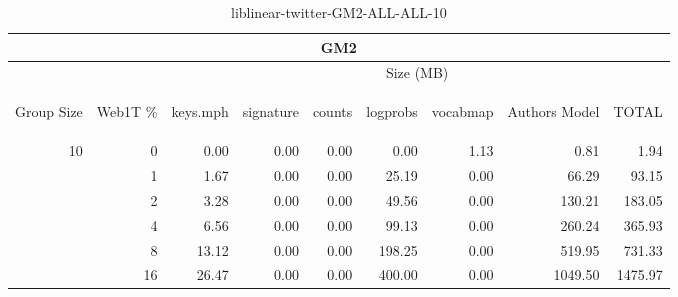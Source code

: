 \begin{center}
\begin{table}[htbp] 
 \begin{center}
\begin{tabular}{ | r | r | r | r | r | r | r | r | r |}
\hline
\multicolumn{9}{|c|}{GM2}\\
\hline
 & & \multicolumn{7}{|c|}{Size (MB)}\\ \cline{3-9}
\begin{sideways}Group Size\end{sideways} & \begin{sideways}Web1T \% \end{sideways} & \begin{sideways}keys.mph\end{sideways} & \begin{sideways}signature\end{sideways} & \begin{sideways}counts\end{sideways} & \begin{sideways}logprobs\end{sideways} & \begin{sideways}vocabmap\end{sideways} & \begin{sideways}Authors Model \end{sideways} & \begin{sideways}TOTAL\end{sideways}\\
\hline
\multirow{5}{*}{10}
 & 0 & 0.00 & 0.00 & 0.00 & 0.00 & 1.13 & 0.81 & 1.94\\ \cline{2-9}
 & 1 & 1.67 & 0.00 & 0.00 & 25.19 & 0.00 & 66.29 & 93.15\\ \cline{2-9}
 & 2 & 3.28 & 0.00 & 0.00 & 49.56 & 0.00 & 130.21 & 183.05\\ \cline{2-9}
 & 4 & 6.56 & 0.00 & 0.00 & 99.13 & 0.00 & 260.24 & 365.93\\ \cline{2-9}
 & 8 & 13.12 & 0.00 & 0.00 & 198.25 & 0.00 & 519.95 & 731.33\\ \cline{2-9}
 & 16 & 26.47 & 0.00 & 0.00 & 400.00 & 0.00 & 1049.50 & 1475.97\\ \cline{2-9}
\hline
\end{tabular}
\caption{liblinear-twitter-GM2-ALL-ALL-10}
\label{table:liblinear-twitter-GM2-ALL-ALL-10}
\end{center}
 \end{table}
\end{center}

